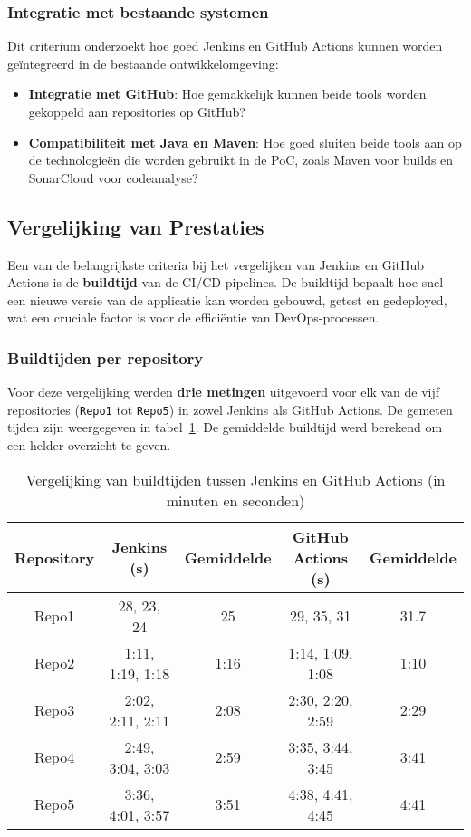 \subsubsection{Integratie met bestaande systemen}
Dit criterium onderzoekt hoe goed Jenkins en GitHub Actions kunnen worden geïntegreerd in de bestaande ontwikkelomgeving:
\begin{itemize}
    \item \textbf{Integratie met GitHub}: Hoe gemakkelijk kunnen beide tools worden gekoppeld aan repositories op GitHub?
    \item \textbf{Compatibiliteit met Java en Maven}: Hoe goed sluiten beide tools aan op de technologieën die worden gebruikt in de PoC, zoals Maven voor builds en SonarCloud voor codeanalyse?
\end{itemize}

\subsection{Vergelijking van Prestaties}

Een van de belangrijkste criteria bij het vergelijken van Jenkins en GitHub Actions is de \textbf{buildtijd} van de CI/CD-pipelines. De buildtijd bepaalt hoe snel een nieuwe versie van de applicatie kan worden gebouwd, getest en gedeployed, wat een cruciale factor is voor de efficiëntie van DevOps-processen.

\subsubsection{Buildtijden per repository}

Voor deze vergelijking werden \textbf{drie metingen} uitgevoerd voor elk van de vijf repositories (\texttt{Repo1} tot \texttt{Repo5}) in zowel Jenkins als GitHub Actions. De gemeten tijden zijn weergegeven in tabel~\ref{tab:performance_comparison}. De gemiddelde buildtijd werd berekend om een helder overzicht te geven.

\begin{table}[h!]
    \centering
    \caption{Vergelijking van buildtijden tussen Jenkins en GitHub Actions (in minuten en seconden)}
    \label{tab:performance_comparison}
    \begin{tabular}{|c|c|c|c|c|}
        \hline
        \textbf{Repository} & \textbf{Jenkins (s)} & \textbf{Gemiddelde} & \textbf{GitHub Actions (s)} & \textbf{Gemiddelde} \\
        \hline
        Repo1 & 28, 23, 24 & 25 & 29, 35, 31 & 31.7 \\
        Repo2 & 1:11, 1:19, 1:18 & 1:16 & 1:14, 1:09, 1:08 & 1:10 \\
        Repo3 & 2:02, 2:11, 2:11 & 2:08 & 2:30, 2:20, 2:59 & 2:29 \\
        Repo4 & 2:49, 3:04, 3:03 & 2:59 & 3:35, 3:44, 3:45 & 3:41 \\
        Repo5 & 3:36, 4:01, 3:57 & 3:51 & 4:38, 4:41, 4:45 & 4:41 \\
        \hline
    \end{tabular}
\end{table}

